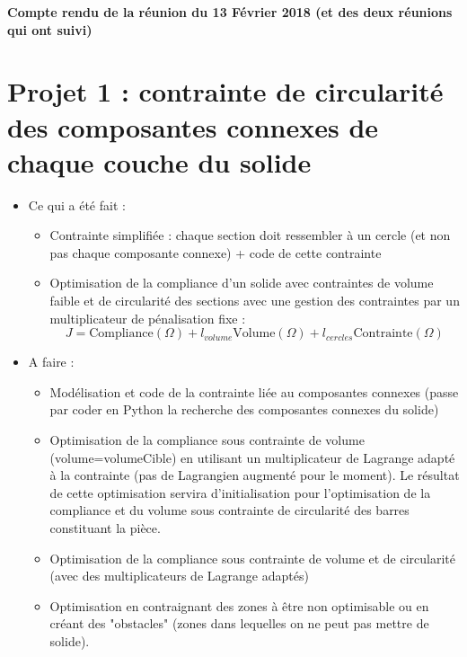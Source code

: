 \documentclass[11pt,a4paper]{article}
\begin{document}
\newcommand{\dive}{\textrm{div}}

\begin{center}
	\textbf{Compte rendu de la réunion du 13 Février 2018 (et des deux réunions qui ont suivi)}
\end{center}

\section{Projet 1  : contrainte de circularité des composantes connexes de chaque couche du solide}

	\begin{itemize}
		\item Ce qui a été fait :
		\begin{itemize}
			\item Contrainte simplifiée : chaque section doit ressembler à un cercle (et non pas chaque composante connexe) + code de cette contrainte
			\item Optimisation de la compliance d'un solide avec contraintes de volume faible et de circularité des sections avec une gestion des contraintes par un multiplicateur de pénalisation fixe :
			\begin{equation}
			J=\textrm{Compliance}(\Omega)+l_{volume}\textrm{Volume}(\Omega)+l_{cercles}\textrm{Contrainte}(\Omega)
			\end{equation}
		\end{itemize}
		
		\item A faire :
		\begin{itemize}
			\item Modélisation et code de la contrainte liée au composantes connexes (passe par coder en Python la recherche des composantes connexes du solide)
			\item Optimisation de la compliance sous contrainte de volume (volume=volumeCible) en utilisant un multiplicateur de Lagrange adapté à la contrainte (pas de Lagrangien augmenté pour le moment). Le résultat de cette optimisation servira d'initialisation pour l'optimisation de la compliance et du volume sous contrainte de circularité des barres constituant la pièce.
			\item Optimisation de la compliance sous contrainte de volume et de circularité (avec des multiplicateurs de Lagrange adaptés)
			\item Optimisation en contraignant des zones à être non optimisable ou en créant des "obstacles" (zones dans lequelles on ne peut pas mettre de solide).
		\end{itemize}
	\end{itemize}
\end{document}

